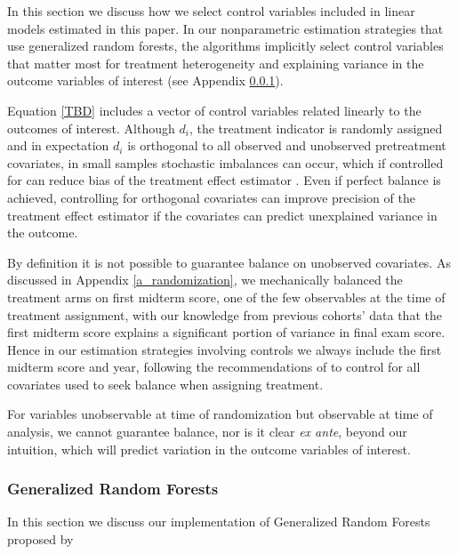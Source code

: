\documentclass[12pt]{article}
\begin{document}
In this section we discuss how we select control variables included in linear models estimated in this paper. In our nonparametric estimation strategies that use generalized random forests, the algorithms implicitly select control variables that matter most for treatment heterogeneity and explaining variance in the outcome variables of interest (see Appendix \ref{a_grf}).

Equation \ref{TBD} includes a vector of control variables related linearly to the outcomes of interest. Although $d_i$, the treatment indicator is randomly assigned and in expectation $d_i$ is orthogonal to all observed and unobserved pretreatment covariates, in small samples stochastic imbalances can occur, which if controlled for can reduce bias of the treatment effect estimator \parencite{ai2017}. Even if perfect balance is achieved, controlling for orthogonal covariates can improve precision of the treatment effect estimator if the covariates can predict unexplained variance in the outcome. 

By definition it is not possible to guarantee balance on unobserved covariates. As discussed in Appendix \ref{a_randomization}, we mechanically balanced the treatment arms on first midterm score, one of the few observables at the time of treatment assignment, with our knowledge from previous cohorts' data that the first midterm score explains a significant portion of variance in final exam score. Hence in our estimation strategies involving controls we always include the first midterm score and year, following the recommendations of \textcite{bm2009} to control for all covariates used to seek balance when assigning treatment.

For variables unobservable at time of randomization but observable at time of analysis, we cannot guarantee balance, nor is it clear \textit{ex ante}, beyond our intuition, which will predict variation in the outcome variables of interest. 

\subsubsection{Generalized Random Forests} \label{a_grf}

In this section we discuss our implementation of Generalized Random Forests proposed by \textcite{atw2019}


\item
\end{document}
